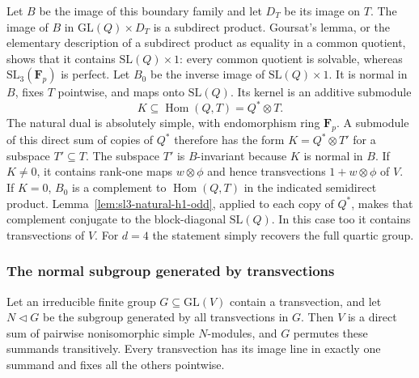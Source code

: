 Let $B$ be the image of this boundary family and let $D_T$ be its
image on $T$.  The image of $B$ in
$\mathrm{GL}(Q)\times D_T$ is a subdirect product.  Goursat's lemma,
or the elementary description of a subdirect product as equality in
a common quotient, shows that it contains
$\mathrm{SL}(Q)\times1$: every common quotient is solvable, whereas
$\mathrm{SL}_3(\mathbf F_p)$ is perfect.  Let $B_0$ be the inverse
image of $\mathrm{SL}(Q)\times1$.  It is normal in $B$, fixes $T$
pointwise, and maps onto $\mathrm{SL}(Q)$.
Its kernel is an additive submodule
\begin{equation}\label{eq:odd-quartic-kernel}
 K\subseteq\operatorname{Hom}(Q,T)=Q^*\otimes T.
\end{equation}
The natural dual is absolutely simple, with endomorphism ring
$\mathbf F_p$.  A submodule of this direct sum of copies of $Q^*$
therefore has the form $K=Q^*\otimes T'$ for a subspace $T'\subseteq T$.
The subspace $T'$ is $B$-invariant because $K$ is normal in $B$.
If $K\ne0$, it contains rank-one maps $w\otimes\phi$ and hence
transvections $1+w\otimes\phi$ of $V$.  If $K=0$, $B_0$ is a
complement to $\operatorname{Hom}(Q,T)$ in the indicated semidirect
product.  Lemma~\ref{lem:sl3-natural-h1-odd}, applied to each copy of
$Q^*$, makes that complement conjugate to the block-diagonal
$\mathrm{SL}(Q)$.  In this case too it contains transvections of $V$.
For $d=4$ the statement simply recovers the full quartic group.

\subsubsection{The normal subgroup generated by transvections}

\begin{lemma}\label{lem:transvection-clifford-blocks}
Let an irreducible finite group $G\subseteq\mathrm{GL}(V)$ contain a
transvection, and let $N\triangleleft G$ be the subgroup generated by
all transvections in $G$.  Then $V$ is a direct sum of pairwise
nonisomorphic simple $N$-modules, and $G$ permutes these summands
transitively.  Every transvection has its image line in exactly one
summand and fixes all the others pointwise.
\end{lemma}

